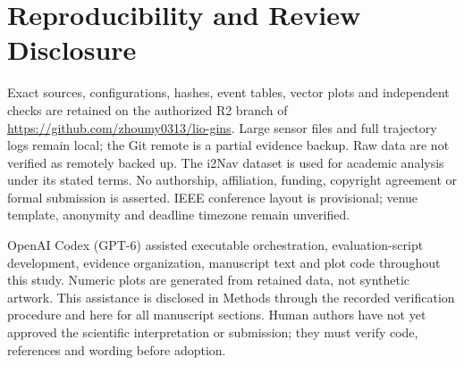 \documentclass[conference]{IEEEtran}
\begin{document}
\section*{Reproducibility and Review Disclosure}
Exact sources, configurations, hashes, event tables, vector plots and independent checks are retained on the authorized R2 branch of \url{https://github.com/zhoumy0313/lio-gins}. Large sensor files and full trajectory logs remain local; the Git remote is a partial evidence backup. Raw data are not verified as remotely backed up. The i2Nav dataset is used for academic analysis under its stated terms. No authorship, affiliation, funding, copyright agreement or formal submission is asserted. IEEE conference layout is provisional; venue template, anonymity and deadline timezone remain unverified.

OpenAI Codex (GPT-6) assisted executable orchestration, evaluation-script development, evidence organization, manuscript text and plot code throughout this study. Numeric plots are generated from retained data, not synthetic artwork. This assistance is disclosed in Methods through the recorded verification procedure and here for all manuscript sections. Human authors have not yet approved the scientific interpretation or submission; they must verify code, references and wording before adoption.


\end{document}
